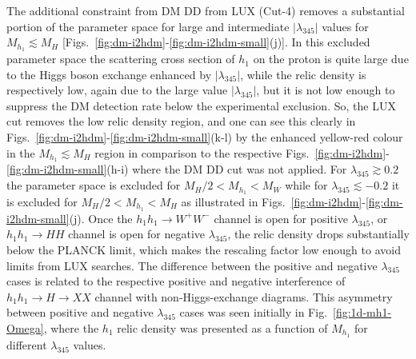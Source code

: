 \documentclass[12pt,a4paper]{article}
\begin{document}
The additional constraint from DM DD from LUX (Cut-4)
removes a substantial portion of the  parameter space for large and intermediate $|\lambda_{345}|$
values for $M_{h_1}\lesssim M_H$  [Figs.~\ref{fig:dm-i2hdm}-\ref{fig:dm-i2hdm-small}(j)].
In this excluded parameter space the scattering cross section of $h_1$ on the proton 
is quite large due to the Higgs boson exchange enhanced by $|\lambda_{345}|$, while the relic density is respectively low,
again due to the large value  $|\lambda_{345}|$, but it is not low enough to suppress
the DM detection rate below the experimental exclusion.
So, the LUX cut removes the low relic density region, 
and one can see this clearly in Figs.~\ref{fig:dm-i2hdm}-\ref{fig:dm-i2hdm-small}(k-l)
by the enhanced yellow-red colour in the $M_{h_1}\lesssim M_H$ region 
in comparison to the respective Figs.~\ref{fig:dm-i2hdm}-\ref{fig:dm-i2hdm-small}(h-i)
where the DM DD cut was not applied.
For $\lambda_{345} \gtrsim 0.2$ the parameter space is excluded
for $M_H/2<M_{h_1}<M_W$ while for  $\lambda_{345} \lesssim -0.2$
it is excluded for $M_H/2<M_{h_1}<M_H$ as illustrated in Figs.~\ref{fig:dm-i2hdm}-\ref{fig:dm-i2hdm-small}(j).
Once the $h_1 h_1 \to W^+ W^-$ channel is open for positive  $\lambda_{345}$,
or $h_1 h_1 \to H H$ channel is open for negative $\lambda_{345}$,
the relic density drops substantially below the PLANCK limit, which makes the rescaling factor 
low enough to avoid limits from LUX searches.
The difference between the positive and negative $\lambda_{345}$ cases
is related to the respective positive and negative interference of
$h_1 h_1 \to H \to X X$ channel with non-Higgs-exchange diagrams.
This asymmetry between positive and negative $\lambda_{345}$ cases was seen initially
in Fig.~\ref{fig:1d-mh1-Omega}, where the $h_1$ relic density was presented as a function 
of $M_{h_1}$ for different $\lambda_{345}$ values.
\end{document}

